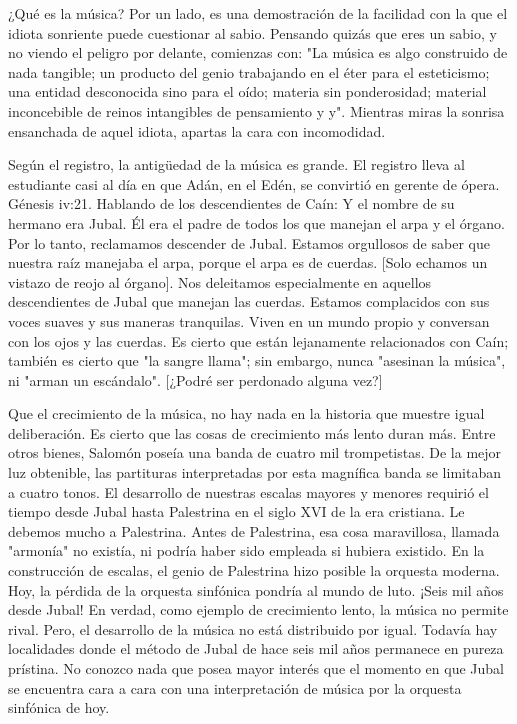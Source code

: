 \documentclass[12pt]{book}
\begin{document}
¿Qué es la música? Por un lado, es una demostración de la facilidad con la que el idiota sonriente puede cuestionar al sabio. Pensando quizás que eres un sabio, y no viendo el peligro por delante, comienzas con: "La música es algo construido de nada tangible; un producto del genio trabajando en el éter para el esteticismo; una entidad desconocida sino para el oído; materia sin ponderosidad; material inconcebible de reinos intangibles de pensamiento y y". Mientras miras la sonrisa ensanchada de aquel idiota, apartas la cara con incomodidad.

Según el registro, la antigüedad de la música es grande. El registro lleva al estudiante casi al día en que Adán, en el Edén, se convirtió en gerente de ópera. Génesis iv:21. Hablando de los descendientes de Caín: Y el nombre de su hermano era Jubal. Él era el padre de todos los que manejan el arpa y el órgano.
Por lo tanto, reclamamos descender de Jubal. Estamos orgullosos de saber que nuestra raíz manejaba el arpa, porque el arpa es de cuerdas. [Solo echamos un vistazo de reojo al órgano]. Nos deleitamos especialmente en aquellos descendientes de Jubal que manejan las cuerdas. Estamos complacidos con sus voces suaves y sus maneras tranquilas. Viven en un mundo propio y conversan con los ojos y las cuerdas. Es cierto que están lejanamente relacionados con Caín; también es cierto que "la sangre llama"; sin embargo, nunca "asesinan la música", ni "arman un escándalo". [¿Podré ser perdonado alguna vez?]

Que el crecimiento de la música, no hay nada en la historia que muestre igual deliberación. Es cierto que las cosas de crecimiento más lento duran más. Entre otros bienes, Salomón poseía una banda de cuatro mil trompetistas. De la mejor luz obtenible, las partituras interpretadas por esta magnífica banda se limitaban a cuatro tonos. El desarrollo de nuestras escalas mayores y menores requirió el tiempo desde Jubal hasta Palestrina en el siglo XVI de la era cristiana. Le debemos mucho a Palestrina. Antes de Palestrina, esa cosa maravillosa, llamada "armonía" no existía, ni podría haber sido empleada si hubiera existido. En la construcción de escalas, el genio de Palestrina hizo posible la orquesta moderna. Hoy, la pérdida de la orquesta sinfónica pondría al mundo de luto. ¡Seis mil años desde Jubal! En verdad, como ejemplo de crecimiento lento, la música no permite rival. Pero, el desarrollo de la música no está distribuido por igual. Todavía hay localidades donde el método de Jubal de hace seis mil años permanece en pureza prístina. No conozco nada que posea mayor interés que el momento en que Jubal se encuentra cara a cara con una interpretación de música por la orquesta sinfónica de hoy.
\end{document}
